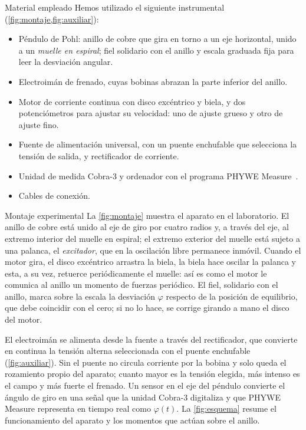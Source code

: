 \documentclass[a4paper,11pt]{amsart}
\makeatletter
\def\subsection{\@startsection{subsection}{2}%
  \z@{.9\linespacing\@plus.6\linespacing}{.3\linespacing}%
  {\normalfont\bfseries\color{azulprof}}}
\numberwithin{equation}{section}
\theoremstyle{cienplano}
\theoremstyle{ciendef}
\theoremstyle{cienobs}
\makeatother
\begin{document}
\subsection{Material empleado}\label{sec:material}
Hemos utilizado el siguiente instrumental (\cref{fig:montaje,fig:auxiliar}):
\begin{itemize}
  \item Péndulo de Pohl: anillo de cobre que gira en torno a un eje horizontal,
        unido a un \emph{muelle en espiral}; fiel solidario con el anillo y
        escala graduada fija para leer la desviación angular.
  \item Electroimán de frenado, cuyas bobinas abrazan la parte inferior del
        anillo.
  \item Motor de corriente continua con disco excéntrico y biela, y dos
        potenciómetros para ajustar su velocidad: uno de ajuste grueso y otro
        de ajuste fino.
  \item Fuente de alimentación universal, con un puente enchufable que
        selecciona la tensión de salida, y rectificador de corriente.
  \item Unidad de medida Cobra-3 y ordenador con el programa PHYWE
        Measure~\cite{PHYWE}.
  \item Cables de conexión.
\end{itemize}

\subsection{Montaje experimental}\label{sec:montaje}
La \cref{fig:montaje} muestra el aparato en el laboratorio. El anillo de cobre
está unido al eje de giro por cuatro radios y, a través del eje, al extremo
interior del muelle en espiral; el extremo exterior del muelle está sujeto a
una palanca, el \emph{excitador}, que en la oscilación libre permanece
inmóvil. Cuando el motor gira, el disco excéntrico arrastra la biela, la biela
hace oscilar la palanca y esta, a su vez, retuerce periódicamente el muelle:
así es como el motor le comunica al anillo un momento de fuerzas periódico.
El fiel, solidario con el anillo, marca sobre la escala la desviación $\varphi$
respecto de la posición de equilibrio, que debe coincidir con el cero; si no
lo hace, se corrige girando a mano el disco del motor.

El electroimán se alimenta desde la fuente a través del rectificador, que
convierte en continua la tensión alterna seleccionada con el puente enchufable
(\cref{fig:auxiliar}). Sin el puente no circula corriente por la bobina y solo
queda el rozamiento propio del aparato; cuanto mayor es la tensión elegida,
más intenso es el campo y más fuerte el frenado. Un sensor en el eje del
péndulo convierte el ángulo de giro en una señal que la unidad Cobra-3
digitaliza y que PHYWE Measure representa en tiempo real como $\varphi(t)$.
La \cref{fig:esquema} resume el funcionamiento del aparato y los momentos que
actúan sobre el anillo.
\end{document}
